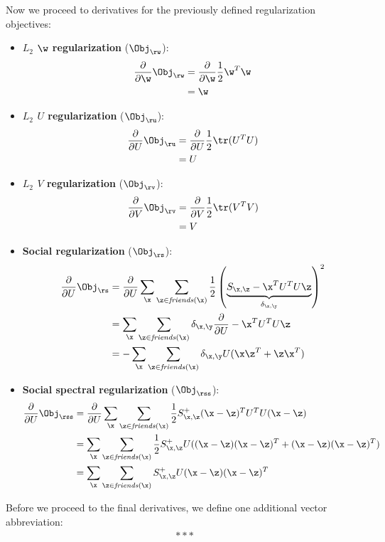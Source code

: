 Now we proceed to derivatives for the previously defined
regularization objectives:
\begin{itemize}
\item {\bf $L_2$ $\w$ regularization} ($\Obj_\rw$):
\begin{align*}
\frac{\partial}{\partial \w} \Obj_\rw & = \frac{\partial}{\partial \w} \frac{1}{2} \w^T \w\\
& = \w
\end{align*}
\item {\bf $L_2$ $U$ regularization} ($\Obj_\ru$):
\begin{align*}
\frac{\partial}{\partial U} \Obj_\ru & = \frac{\partial}{\partial U} \frac{1}{2} \tr(U^T U) \\
& = U
\end{align*}
\item {\bf $L_2$ $V$ regularization} ($\Obj_\rv$):
\begin{align*}
\frac{\partial}{\partial V} \Obj_\rv & = \frac{\partial}{\partial V} \frac{1}{2} \tr(V^T V) \\
& = V
\end{align*}
\item {\bf Social regularization} ($\Obj_\rs$):
\begin{align*}
\frac{\partial}{\partial U} \Obj_\rs & = \frac{\partial}{\partial U} \sum_{\x} \sum_{\z \in \mathit{friends}(\x)} \frac{1}{2} \left( \underbrace{S_{\x,\z} - \x^T U^T U \z}_{\delta_{\x,\y}} \right)^2 \\
& = \sum_{\x} \sum_{\z \in \mathit{friends}(\x)} \delta_{\x,\y} \frac{\partial}{\partial U} - \x^T U^T U \z \\
& = - \sum_{\x} \sum_{\z \in \mathit{friends}(\x)} \delta_{\x,\y} U (\x \z^T + \z \x^T)
\end{align*}
\item {\bf Social spectral regularization} ($\Obj_\rss$):
\begin{align*}
\frac{\partial}{\partial U} \Obj_\rss & = \frac{\partial}{\partial U} \sum_{\x} \sum_{\z \in \mathit{friends}(\x)} \frac{1}{2} S^+_{\x,\z} (\x - \z)^T U^T U (\x - \z) \\
& = \sum_{\x} \sum_{\z \in \mathit{friends}(\x)} \frac{1}{2} S^+_{\x,\z} U ((\x - \z)(\x - \z)^T + (\x - \z)(\x - \z)^T)\\
& = \sum_{\x} \sum_{\z \in \mathit{friends}(\x)} S^+_{\x,\z} U (\x - \z)(\x - \z)^T
\end{align*}
\end{itemize}

Before we proceed to the final derivatives, we define one additional
vector abbreviation: 
\begin{align*}
***
\end{align*}

